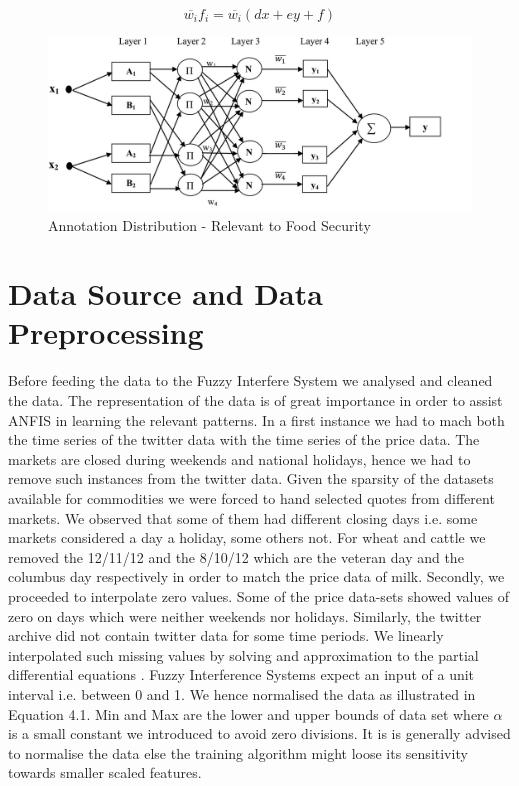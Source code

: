  \begin{equation} \label{eq:layer4}
 \overline{w_i} f_i =  \overline{w_i }(dx + ey + f) \end{equation}



\begin{figure}[H]
        \centering
         \includegraphics[width=1\textwidth ]{img/model/gnn_fuzz}      
        \caption{Annotation Distribution - Relevant to Food Security}
        \label{fig:gnn_fuzz}
\end{figure}





\section{Data Source and Data Preprocessing}

Before feeding the data to the Fuzzy Interfere System we analysed and cleaned the data. The representation of the data is of great importance in order to assist ANFIS in learning the relevant patterns. In a first instance we had to mach both the time series of the twitter data with the time series of the price data. The markets are closed during weekends and national holidays, hence we had to remove such instances from the twitter data. Given the sparsity of the datasets available for commodities we were forced to hand selected quotes from different markets. We observed that some of them had different closing days i.e. some markets considered a day a holiday, some others not. For wheat and cattle we removed the 12/11/12 and the 8/10/12 which are the veteran day and the columbus day respectively in order to match the price data of milk.  Secondly, we proceeded to interpolate zero values. Some of the price data-sets showed values of zero on days which were neither weekends nor holidays. Similarly, the twitter archive did not contain  twitter data for some time periods. We linearly interpolated such missing values by solving and approximation to the partial differential equations \cite{john2012}.  Fuzzy Interference Systems expect an input of a unit interval i.e. between 0 and 1. We hence normalised the data as illustrated in Equation 4.1. Min and Max are the lower and upper bounds of data set where $\alpha$ is a small constant we introduced to avoid zero divisions. It is is generally advised to normalise the data else the training algorithm might loose its sensitivity towards smaller scaled features. 

